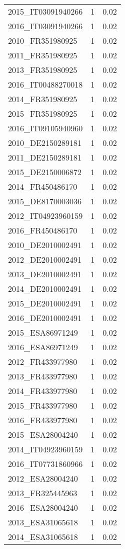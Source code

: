 \begin{table*}[htbp]
\begin{tabular}{lrr}
2015_IT03091940266 & 1 & 0.02 \\
2016_IT03091940266 & 1 & 0.02 \\
2010_FR351980925 & 1 & 0.02 \\
2011_FR351980925 & 1 & 0.02 \\
2013_FR351980925 & 1 & 0.02 \\
2016_IT00488270018 & 1 & 0.02 \\
2014_FR351980925 & 1 & 0.02 \\
2015_FR351980925 & 1 & 0.02 \\
2016_IT09105940960 & 1 & 0.02 \\
2010_DE2150289181 & 1 & 0.02 \\
2011_DE2150289181 & 1 & 0.02 \\
2015_DE2150006872 & 1 & 0.02 \\
2014_FR450486170 & 1 & 0.02 \\
2015_DE8170003036 & 1 & 0.02 \\
2012_IT04923960159 & 1 & 0.02 \\
2016_FR450486170 & 1 & 0.02 \\
2010_DE2010002491 & 1 & 0.02 \\
2012_DE2010002491 & 1 & 0.02 \\
2013_DE2010002491 & 1 & 0.02 \\
2014_DE2010002491 & 1 & 0.02 \\
2015_DE2010002491 & 1 & 0.02 \\
2016_DE2010002491 & 1 & 0.02 \\
2015_ESA86971249 & 1 & 0.02 \\
2016_ESA86971249 & 1 & 0.02 \\
2012_FR433977980 & 1 & 0.02 \\
2013_FR433977980 & 1 & 0.02 \\
2014_FR433977980 & 1 & 0.02 \\
2015_FR433977980 & 1 & 0.02 \\
2016_FR433977980 & 1 & 0.02 \\
2015_ESA28004240 & 1 & 0.02 \\
2014_IT04923960159 & 1 & 0.02 \\
2016_IT07731860966 & 1 & 0.02 \\
2012_ESA28004240 & 1 & 0.02 \\
2013_FR325445963 & 1 & 0.02 \\
2016_ESA28004240 & 1 & 0.02 \\
2013_ESA31065618 & 1 & 0.02 \\
2014_ESA31065618 & 1 & 0.02 \\

\end{tabular}
\end{table*}
